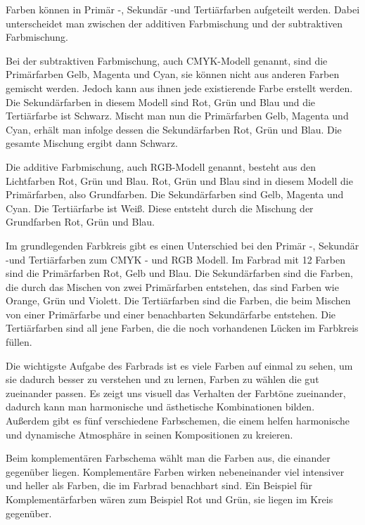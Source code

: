 Farben können in Primär -, Sekundär -und Tertiärfarben aufgeteilt werden. Dabei unterscheidet man zwischen der additiven Farbmischung und der subtraktiven Farbmischung. 
\cite{_special_subjects}

Bei der subtraktiven Farbmischung, auch CMYK-Modell genannt, sind die Primärfarben Gelb, Magenta und Cyan, sie können nicht aus anderen Farben gemischt werden. Jedoch kann aus ihnen jede existierende Farbe erstellt werden. Die Sekundärfarben in diesem Modell sind Rot, Grün und Blau und die Tertiärfarbe ist Schwarz. Mischt man nun die Primärfarben Gelb, Magenta und Cyan, erhält man infolge dessen die Sekundärfarben Rot, Grün und Blau. Die gesamte Mischung ergibt dann Schwarz.
\cite{_special_subjects}


Die additive Farbmischung, auch RGB-Modell genannt, besteht aus den Lichtfarben Rot, Grün und Blau. Rot, Grün und Blau sind in diesem Modell die Primärfarben, also Grundfarben. Die Sekundärfarben sind Gelb, Magenta und Cyan. Die Tertiärfarbe ist Weiß. Diese entsteht durch die Mischung der Grundfarben Rot, Grün und Blau.
\cite{_special_subjects}

Im grundlegenden Farbkreis gibt es einen Unterschied bei den Primär -, Sekundär -und Tertiärfarben zum CMYK - und RGB Modell. Im Farbrad mit 12 Farben sind die Primärfarben Rot, Gelb und Blau. Die Sekundärfarben sind die Farben, die durch das Mischen von zwei Primärfarben entstehen, das sind Farben wie Orange, Grün und Violett. Die Tertiärfarben sind die Farben, die beim Mischen von einer Primärfarbe und einer benachbarten Sekundärfarbe entstehen. Die Tertiärfarben sind all jene Farben, die die noch vorhandenen Lücken im Farbkreis füllen.
\cite{_special_subjects}

Die wichtigste Aufgabe des Farbrads ist es viele Farben auf einmal zu sehen, um sie dadurch besser zu verstehen und zu lernen, Farben zu wählen die gut zueinander passen. Es zeigt uns visuell das Verhalten der Farbtöne zueinander, dadurch kann man harmonische und ästhetische Kombinationen bilden.
Außerdem gibt es fünf verschiedene Farbschemen, die einem helfen harmonische und dynamische Atmosphäre in seinen Kompositionen zu kreieren.
\cite{_special_subjects}

Beim komplementären Farbschema wählt man die Farben aus, die einander gegenüber liegen. Komplementäre Farben wirken nebeneinander viel intensiver und heller als Farben, die im Farbrad benachbart sind. Ein Beispiel für Komplementärfarben wären zum Beispiel Rot und Grün, sie liegen im Kreis gegenüber.
\cite{_special_subjects}

